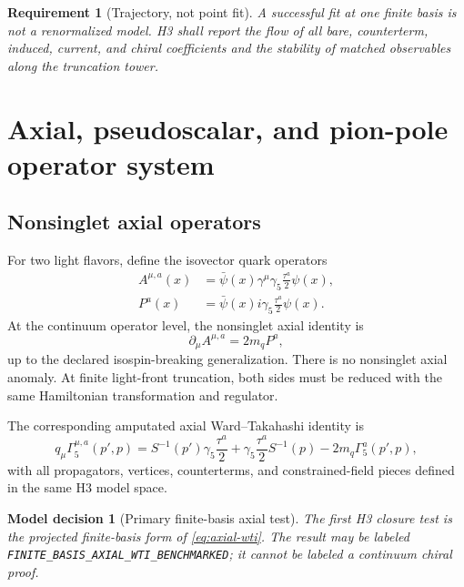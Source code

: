\documentclass[11pt]{article}
\newtheorem{requirement}[definition]{Requirement}
\newtheorem{decision}[definition]{Model decision}
\begin{document}
\begin{requirement}[Trajectory, not point fit]
A successful fit at one finite basis is not a renormalized model.  H3 shall
report the flow of all bare, counterterm, induced, current, and chiral
coefficients and the stability of matched observables along the truncation
tower.
\end{requirement}

\section{Axial, pseudoscalar, and pion-pole operator system}
\label{sec:axial}

\subsection{Nonsinglet axial operators}

For two light flavors, define the isovector quark operators
\begin{align}
 A^{\mu,a}(x)
 &=
 \bar\psi(x)\gamma^{\mu}\gamma_5\frac{\tau^a}{2}\psi(x),
 \\
 P^a(x)
 &=
 \bar\psi(x)i\gamma_5\frac{\tau^a}{2}\psi(x).
 \label{eq:axial-pseudoscalar-def}
\end{align}
At the continuum operator level, the nonsinglet axial identity is
\cite{Nambu1960,Chen2021,Alexandrou2024}
\begin{equation}
 \partial_{\mu}A^{\mu,a}
 =2m_q P^a,
 \label{eq:qcd-pcac}
\end{equation}
up to the declared isospin-breaking generalization.  There is no nonsinglet
axial anomaly.  At finite light-front truncation, both sides must be reduced
with the same Hamiltonian transformation and regulator.

The corresponding amputated axial Ward--Takahashi identity is
\begin{equation}
 q_{\mu}\Gamma_{5}^{\mu,a}(p',p)
 =
 S^{-1}(p')\gamma_5\frac{\tau^a}{2}
 +
 \gamma_5\frac{\tau^a}{2}S^{-1}(p)
 -2m_q\Gamma_5^a(p',p),
 \label{eq:axial-wti}
\end{equation}
with all propagators, vertices, counterterms, and constrained-field pieces
defined in the same H3 model space.

\begin{decision}[Primary finite-basis axial test]
The first H3 closure test is the projected finite-basis form of
\cref{eq:axial-wti}.  The result may be labeled
\texttt{FINITE\_BASIS\_AXIAL\_WTI\_BENCHMARKED}; it cannot be labeled a
continuum chiral proof.
\end{decision}
\end{document}
